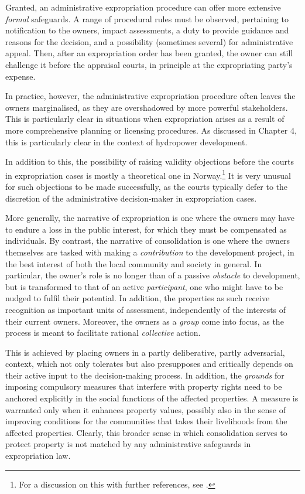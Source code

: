 Granted, an administrative expropriation procedure can offer more extensive {\it formal} safeguards. A range of procedural rules must be observed, pertaining to notification to the owners, impact assessments, a duty to provide guidance and reasons for the decision, and a possibility (sometimes several) for administrative appeal. Then, after an expropriation order has been granted, the owner can still challenge it before the appraisal courts, in principle at the expropriating party's expense. 

In practice, however, the administrative expropriation procedure often leaves the owners marginalised, as they are overshadowed by more powerful stakeholders. This is particularly clear in situations when expropriation arises as a result of more comprehensive planning or licensing procedures. As discussed in Chapter 4, this is particularly clear in the context of hydropower development. 

In addition to this, the possibility of raising validity objections before the courts in expropriation cases is mostly a theoretical one in Norway.\footnote{For a discussion on this with further references, see \cite[x]{dyrkolbotn15}.} It is very unusual for such objections to be made successfully, as the courts typically defer to the discretion of the administrative decision-maker in expropriation cases.

More generally, the narrative of expropriation is one where the owners may have to endure a loss in the public interest, for which they must be compensated as individuals. By contrast, the narrative of consolidation is one where the owners themselves are tasked with making a {\it contribution} to the development project, in the best interest of both the local community and society in general. In particular, the owner's role is no longer than of a passive {\it obstacle} to development, but is transformed to that of an active {\it participant}, one who might have to be nudged to fulfil their potential. In addition, the properties as such receive recognition as important units of assessment, independently of the interests of their current owners. Moreover, the owners as a {\it group} come into focus, as the process is meant to facilitate rational {\it collective} action.

This is achieved by placing owners in a partly deliberative, partly adversarial, context, which not only tolerates but also presupposes and critically depends on their active input to the decision-making process. In addition, the {\it grounds} for imposing compulsory measures that interfere with property rights need to be anchored explicitly in the social functions of the affected properties. A measure is warranted only when it enhances property values, possibly also in the sense of improving conditions for the communities that takes their livelihoods from the affected properties. Clearly, this broader sense in which consolidation serves to protect property is not matched by any administrative safeguards in expropriation law.

